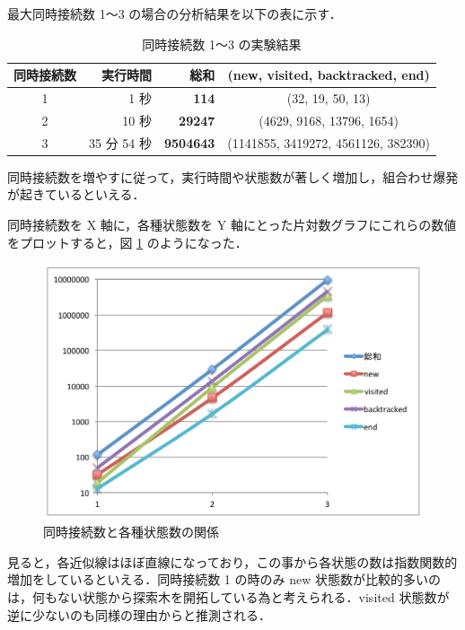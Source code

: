 \documentclass[a4j,12pt]{jarticle}
\begin{document}
最大同時接続数 1〜3 の場合の分析結果を以下の表に示す．

\begin{table}[here]
\caption[同時接続数 1〜3 の実験結果]{同時接続数 1〜3 の実験結果}
\label{table:result-stat}
\begin{center}
\begin{tabular}{crrc}
\toprule
同時接続数 & 実行時間 & 総和 & (new, visited, backtracked, end)  \\
\midrule
1 & 1 秒 &  {\bf 114} & (32, 19, 50, 13)  \\
2 & 10 秒 &  {\bf 29247} & (4629, 9168, 13796, 1654)  \\
3 & 35 分 54 秒 &  {\bf 9504643} & (1141855, 3419272, 4561126, 382390)  \\
\bottomrule
\end{tabular}
\end{center}
\end{table}

同時接続数を増やすに従って，実行時間や状態数が著しく増加し，組合わせ爆発が起きているといえる．

同時接続数を X 軸に，各種状態数を Y 軸にとった片対数グラフにこれらの数値をプロットすると，図 \ref{figure:graph2} のようになった．

\newpage

\begin{figure}[here]
\centering
\includegraphics[width=12cm]{images/graph2.pdf}
\caption{同時接続数と各種状態数の関係}
\label{figure:graph2}
\end{figure}

見ると，各近似線はほぼ直線になっており，この事から各状態の数は指数関数的増加をしているといえる．同時接続数 1 の時のみ new 状態数が比較的多いのは，何もない状態から探索木を開拓している為と考えられる．visited 状態数が逆に少ないのも同様の理由からと推測される．
\end{document}
